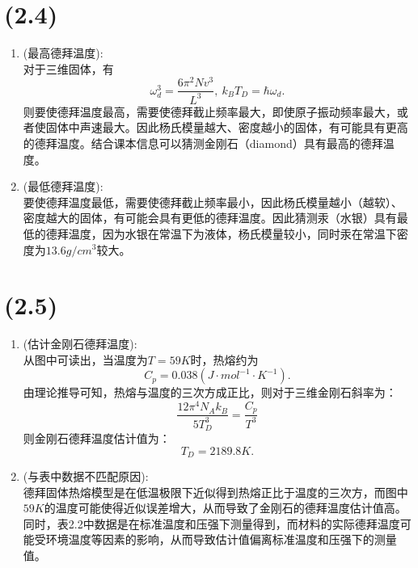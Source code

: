 \documentclass[reqno,a4paper,12pt]{amsart}
\begin{document}
\section{(2.4)}
\begin{enumerate}
	\item (最高德拜温度): \\
	对于三维固体，有
	\[
		\omega_d^3 = \frac{6\pi^2 Nv^3}{L^3}, ~ k_BT_D = \hbar\omega_d.
	\]
	则要使德拜温度最高，需要使德拜截止频率最大，即使原子振动频率最大，或者使固体中声速最大。因此杨氏模量越大、密度越小的固体，有可能具有更高的德拜温度。结合课本信息可以猜测金刚石（diamond）具有最高的德拜温度。
	
	\item (最低德拜温度): \\
	要使德拜温度最低，需要使德拜截止频率最小，因此杨氏模量越小（越软）、密度越大的固体，有可能会具有更低的德拜温度。因此猜测汞（水银）具有最低的德拜温度，因为水银在常温下为液体，杨氏模量较小，同时汞在常温下密度为$13.6g/cm^3$较大。
\end{enumerate}

\section{(2.5)}
\begin{enumerate}
	\item (估计金刚石德拜温度): \\
	从图中可读出，当温度为$T = 59K$时，热熔约为
	\[
		C_p = 0.038(J\cdot mol^{-1}\cdot K^{-1}).
	\]
	由理论推导可知，热熔与温度的三次方成正比，则对于三维金刚石斜率为：
	\[
		\frac{12\pi^4N_Ak_B}{5T_D^3} = \frac{C_p}{T^3}
	\]
	则金刚石德拜温度估计值为：
	\[
		T_D = 2189.8K.
	\]
	
	\item (与表中数据不匹配原因): \\
	德拜固体热熔模型是在低温极限下近似得到热熔正比于温度的三次方，而图中$59K$的温度可能使得近似误差增大，从而导致了金刚石的德拜温度估计值高。同时，表2.2中数据是在标准温度和压强下测量得到，而材料的实际德拜温度可能受环境温度等因素的影响，从而导致估计值偏离标准温度和压强下的测量值。
\end{enumerate}
\end{document}

